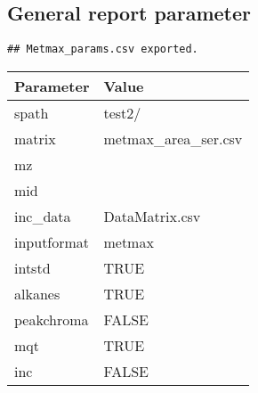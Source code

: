 \documentclass[9pt,]{article}
\begin{document}
\pagebreak

\subsection{General report parameter}\label{general-report-parameter}

\begin{verbatim}
## Metmax_params.csv exported.
\end{verbatim}

\begin{longtable}[]{@{}ll@{}}
\toprule
Parameter & Value\tabularnewline
\midrule
\endhead
spath & test2/\tabularnewline
matrix & metmax\_area\_ser.csv\tabularnewline
mz &\tabularnewline
mid &\tabularnewline
inc\_data & DataMatrix.csv\tabularnewline
inputformat & metmax\tabularnewline
intstd & TRUE\tabularnewline
alkanes & TRUE\tabularnewline
peakchroma & FALSE\tabularnewline
mqt & TRUE\tabularnewline
inc & FALSE\tabularnewline
\bottomrule
\end{longtable}
\newpage
\singlespacing 
\end{document}
